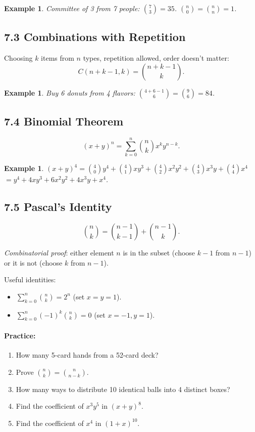 \documentclass[11pt]{article}
\newtheorem{example}[definition]{Example}
\newenvironment{practice}{\paragraph*{\textbf{Practice:}}}{}
\begin{document}
\begin{example}
Committee of 3 from 7 people: $\binom{7}{3}=35$. \quad $\binom{n}{0}=\binom{n}{n}=1$.
\end{example}

\subsection*{7.3 Combinations with Repetition}

Choosing $k$ items from $n$ types, repetition allowed, order doesn't matter:
\[C(n+k-1,k)=\binom{n+k-1}{k}.\]

\begin{example}
Buy 6 donuts from 4 flavors: $\binom{4+6-1}{6}=\binom{9}{6}=84$.
\end{example}

\subsection*{7.4 Binomial Theorem}

\begin{tcolorbox}[keybox={Binomial Theorem}]
\[(x+y)^n=\sum_{k=0}^{n}\binom{n}{k}x^k y^{n-k}.\]
\end{tcolorbox}

\begin{example}
$(x+y)^4=\binom40 y^4+\binom41 xy^3+\binom42 x^2y^2+\binom43 x^3y+\binom44 x^4$
$=y^4+4xy^3+6x^2y^2+4x^3y+x^4$.
\end{example}

\subsection*{7.5 Pascal's Identity}

\[\binom{n}{k}=\binom{n-1}{k-1}+\binom{n-1}{k}.\]

\textit{Combinatorial proof}: either element $n$ is in the subset (choose $k-1$ from $n-1$) or it is not (choose $k$ from $n-1$).

Useful identities:
\begin{itemize}[nosep]
  \item $\sum_{k=0}^n\binom nk=2^n$ (set $x=y=1$).
  \item $\sum_{k=0}^n(-1)^k\binom nk=0$ (set $x=-1,y=1$).
\end{itemize}

\begin{practice}
\begin{enumerate}[nosep,label=\arabic*.]
  \item How many 5-card hands from a 52-card deck?
  \item Prove $\binom{n}{k}=\binom{n}{n-k}$.
  \item How many ways to distribute 10 identical balls into 4 distinct boxes?
  \item Find the coefficient of $x^3y^5$ in $(x+y)^8$.
  \item Find the coefficient of $x^4$ in $(1+x)^{10}$.
\end{enumerate}
\end{practice}
\end{document}
